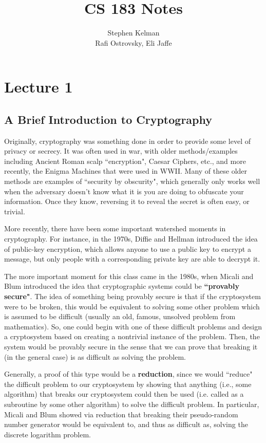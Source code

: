 \documentclass[11pt]{article}
\title{CS 183 Notes}
\author{Stephen Kelman\\ Rafi Ostrovsky, Eli Jaffe}
\begin{document}
\maketitle

\section{Lecture 1}


\subsection{A Brief Introduction to Cryptography}

Originally, cryptography was something done in order to provide some level of privacy or secrecy. It was often used in war, with older methods/examples including Ancient Roman scalp ``encryption", Caesar Ciphers, etc., and more recently, the Enigma Machines that were used in WWII. Many of these older methods are examples of ``security by obscurity", which generally only works well when the adversary doesn't know what it is you are doing to obfuscate your information. Once they know, reversing it to reveal the secret is often easy, or trivial.\medskip

More recently, there have been some important watershed moments in cryptography. For instance, in the 1970s, Diffie and Hellman introduced the idea of public-key encryption, which allows anyone to use a public key to encrypt a message, but only people with a corresponding private key are able to decrypt it.\bigskip

The more important moment for this class came in the 1980s, when Micali and Blum introduced the idea that cryptographic systems could be \textbf{``provably secure"}. The idea of something being provably secure is that if the cryptosystem were to be broken, this would be equivalent to solving some other problem which is assumed to be difficult (usually an old, famous, unsolved problem from mathematics). So, one could begin with one of these difficult problems and design a cryptosystem based on creating a nontrivial instance of the problem. Then, the system would be provably secure in the sense that we can prove that breaking it (in the general case) is as difficult as solving the problem. 

Generally, a proof of this type would be a \textbf{reduction}, since we would ``reduce" the difficult problem to our cryptosystem by showing that anything (i.e., some algorithm) that breaks our cryptosystem could then be used (i.e. called as a subroutine by some other algorithm) to solve the difficult problem. In particular, Micali and Blum showed via reduction that breaking their pseudo-random number generator would be equivalent to, and thus as difficult as, solving the discrete logarithm problem.\smallskip
\end{document}
